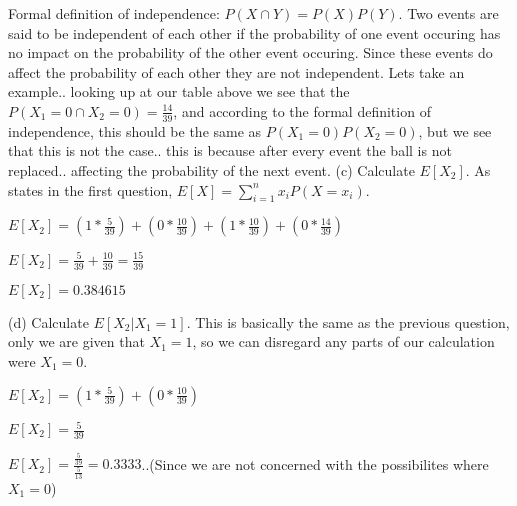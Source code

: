 \documentclass[12pt]{report}
\begin{document}
\newline
Formal definition of independence: $P(X \cap Y) = P(X)P(Y)$. Two events are said to be independent of each other if the probability of one event occuring has no impact on the probability of the other event occuring. Since these events do affect the probability of each other they are not independent. Lets take an example.. looking up at our table above we see that the $P(X_1=0 \cap X_2=0) = \frac{14}{39}$, and according to the formal definition of independence, this should be the same as $P(X_1=0)P(X_2=0)$, but we see that this is not the case.. this is because after every event the ball is not replaced.. affecting the probability of the next event. 
\newline
\newline
(c) Calculate $E[X_2]$.
\newline
As states in the first question, $E[X] = \sum\limits_{i=1}^n x_i P(X = x_i)$. 
\begin{center}
$E[X_2] = (1 * \frac{5}{39}) + (0 * \frac{10}{39}) + (1 * \frac{10}{39}) + (0 * \frac{14}{39})$
\end{center}
\begin{center}
$E[X_2] = \frac{5}{39} + \frac{10}{39} = \frac{15}{39}$
\end{center}
\begin{center}
$E[X_2] = 0.384615$
\end{center}
\quad
\newline
\newline
(d) Calculate $E[X_2|X_1 = 1]$.
This is basically the same as the previous question, only we are given that $X_1 = 1$, so we can disregard any parts of our calculation were $X_1 = 0$.
\begin{center}
$E[X_2] = (1 * \frac{5}{39}) + (0 * \frac{10}{39})$
\end{center}
\begin{center}
$E[X_2] = \frac{5}{39}$
\end{center}
\begin{center}
$E[X_2] = \frac{\frac{5}{39}}{\frac{5}{13}} = 0.3333$..(Since we are not concerned with the possibilites where $X_1 = 0$)
\end{center}
\end{document}
